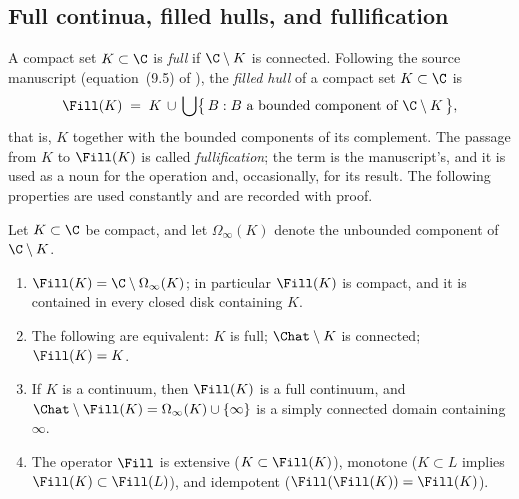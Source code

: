 \subsection{Full continua, filled hulls, and fullification}
\label{subsec:A-full}

A compact set $K\subset\C$ is \emph{full} if $\C\setminus K$ is connected.
Following the source manuscript (equation~(9.5) of \cite{MWman}), the
\emph{filled hull} of a compact set $K\subset\C$ is
\begin{equation}\label{eq:A-fill}
\Fill(K)\;=\;K\,\cup\,
\bigcup\bigl\{\,B : B \text{ a bounded component of }\C\setminus K\,\bigr\},
\end{equation}
that is, $K$ together with the bounded components of its complement.  The
passage from $K$ to $\Fill(K)$ is called \emph{fullification}; the term is
the manuscript's, and it is used as a noun for the operation and,
occasionally, for its result.  The following properties are used
constantly and are recorded with proof.

\begin{lemma}\label{lem:A-full}
Let $K\subset\C$ be compact, and let $\Omega_\infty(K)$ denote the
unbounded component of $\C\setminus K$.
\begin{enumerate}
\item $\Fill(K)=\C\setminus\Omega_\infty(K)$; in particular $\Fill(K)$ is
compact, and it is contained in every closed disk containing $K$.
\item The following are equivalent: $K$ is full; $\Chat\setminus K$ is
connected; $\Fill(K)=K$.
\item If $K$ is a continuum, then $\Fill(K)$ is a full continuum, and
$\Chat\setminus\Fill(K)=\Omega_\infty(K)\cup\{\infty\}$ is a simply
connected domain containing $\infty$.
\item The operator $\Fill$ is extensive ($K\subset\Fill(K)$), monotone
($K\subset L$ implies $\Fill(K)\subset\Fill(L)$), and idempotent
($\Fill(\Fill(K))=\Fill(K)$).
\end{enumerate}
\end{lemma}

